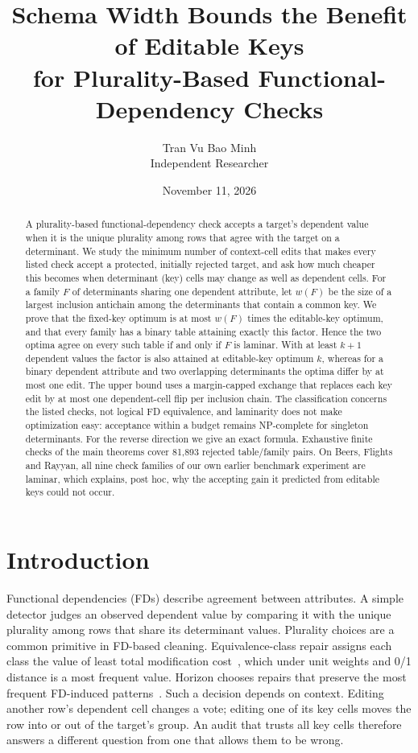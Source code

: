 \documentclass[11pt]{article}
\title{Schema Width Bounds the Benefit of Editable Keys\\
for Plurality-Based Functional-Dependency Checks}
\author{Tran Vu Bao Minh\\[0.4em]\small Independent Researcher}
\date{November 11, 2026}
\theoremstyle{remark}
\begin{document}
\maketitle
\begin{abstract}
A plurality-based functional-dependency check accepts a target's dependent value
when it is the unique plurality among rows that agree with the target on a
determinant. We study the minimum number of context-cell edits that makes every
listed check accept a protected, initially rejected target, and ask how much
cheaper this becomes when determinant (key) cells may change as well as
dependent cells. For a family $F$ of determinants sharing one dependent
attribute, let $w(F)$ be the size of a largest inclusion antichain among the determinants
that contain a common key. We prove that the fixed-key optimum is at most
$w(F)$ times the editable-key optimum, and that every family has a binary table
attaining exactly this factor. Hence the two optima agree on every such table if
and only if $F$ is laminar. With at least $k+1$ dependent values the factor
is also attained at editable-key optimum $k$, whereas for a binary dependent
attribute and two overlapping determinants the optima differ by at most one
edit. The upper bound uses a margin-capped exchange that
replaces each key edit by at most one dependent-cell flip per inclusion chain.
The classification concerns the listed checks, not logical FD equivalence, and
laminarity does not make optimization easy: acceptance within a budget remains
NP-complete for singleton determinants. For the reverse direction we give an
exact formula. Exhaustive finite checks of the main theorems cover 81,893
rejected table/family pairs. On Beers, Flights and Rayyan, all nine check
families of our own earlier benchmark experiment are laminar, which explains,
post hoc, why the accepting gain it predicted from editable keys could not
occur.
\end{abstract}

\section{Introduction}
Functional dependencies (FDs) describe agreement between attributes. A simple
detector judges an observed dependent value by comparing it with the unique
plurality among rows that share its determinant values. Plurality choices are a
common primitive in FD-based cleaning. Equivalence-class repair assigns each
class the value of least total modification cost~\cite{bohannon}, which under
unit weights and 0/1 distance is a most frequent value. Horizon chooses repairs
that preserve the most frequent FD-induced patterns~\cite{horizon}. Such a
decision depends on context. Editing another row's dependent cell changes a vote; editing one of
its key cells moves the row into or out of the target's group. An audit that
trusts all key cells therefore answers a different question from one that
allows them to be wrong.
\end{document}
